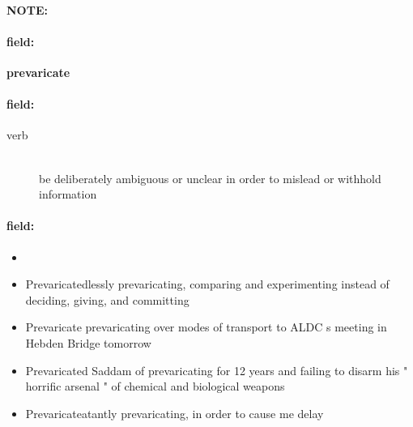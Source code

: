 \documentclass[12pt]{article}
\newenvironment{note}{\paragraph{NOTE:}}{}
\newenvironment{field}{\paragraph{field:}}{}
\begin{document}
\begin{note}
\begin{field}
\textbf{\large prevaricate}
\end{field}


\begin{field}
\begin{description}
\item[verb] \hfill \\ 
be deliberately ambiguous or unclear in order to mislead or withhold information

\end{description}
\end{field}

\begin{field}
\begin{itemize}
\item 
\item Prevaricatedlessly prevaricating, comparing and experimenting instead of deciding, giving, and committing
\item Prevaricate prevaricating over modes of transport to ALDC s meeting in Hebden Bridge tomorrow
\item Prevaricated Saddam of prevaricating for 12 years and failing to disarm his " horrific arsenal " of chemical and biological weapons
\item Prevaricateatantly prevaricating, in order to cause me delay
\end{itemize}
\end{field}
\end{note}
\end{document}
